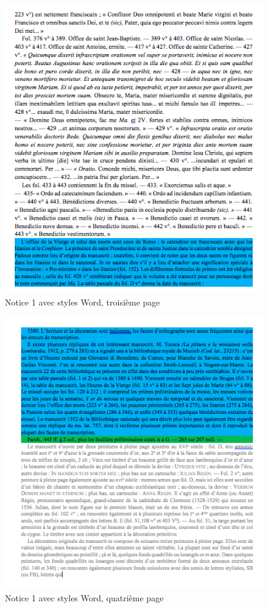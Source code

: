 \documentclass[a4paper,12pt,twoside]{book}
\begin{document}
    \begin{figure}[!h]
    \centering
    \includegraphics[width=15cm]{img/Doc_Sources_transformation/Docs_Word_Styles/Notice1/StylesNotice1_3.png}
    \caption{Notice 1 avec styles Word, troisième page}
    \end{figure}
    
    \begin{figure}[!h]
    \centering
    \includegraphics[width=15cm]{img/Doc_Sources_transformation/Docs_Word_Styles/Notice1/StylesNotice1_4.png}
    \caption{Notice 1 avec styles Word, quatrième page}
    \end{figure}
    \clearpage
    
\end{document}
